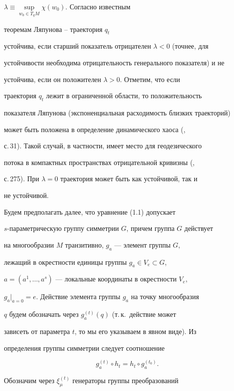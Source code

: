 $\lambda\equiv\sup\limits_{w_0\in T_q M}\chi(w_0)$. Согласно известным 


теоремам Ляпунова \cite{2}--\cite{4} траектория $q_t$ 


устойчива, если старший показатель отрицателен $\lambda<0$ (точнее, для 


устойчивости необходима отрицательность генерального показателя) и не 


устойчива, если он положителен $\lambda>0$. Отметим, что если 


траектория $q_t$ лежит в ограниченной области, то положительность 


показателя Ляпунова (экспоненциальная расходимость близких траекторий) 


может быть положена в определение динамического хаоса (\cite{5}, 


с.\,31). Такой случай, в частности, имеет место для геодезического 


потока в компактных пространствах отрицательной кривизны (\cite{6}, 


с.\,275). При $\lambda=0$ траектория может быть как устойчивой, так и 


не устойчивой. 


 


Будем предполагать далее, что уравнение (1.1) допускает 


$s$-параметрическую группу симметрии $G$, причем группа $G$ действует 


на многообразии $M$ транзитивно, $g_a$ --- элемент группы $G$, 


лежащий в окрестности единицы группы $g_a\in V_e\subset G$, 


$a=(a^1,\dotsc,a^s)$ --- локальные координаты в окрестности $V_e$, 


$g_a|_{a=0}=e$. Действие элемента группы $g_a$ на точку многообразия 


$q$ будем обозначать через $g^{(t)}_a(q)$ (т.\,к.~действие может 


зависеть от параметра $t$, то мы его указываем в явном виде). Из 


определения группы симметрии следует соотношение 


\begin{equation} 


g^{(t)}_a\circ h_t=h_t\circ g^{(t_0)}_a. 


\end{equation} 


Обозначим через $\xi^{(t)}_\mu$ генераторы группы преобразований 


